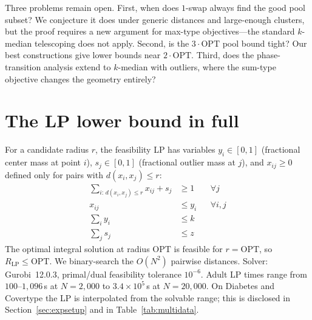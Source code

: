 \documentclass{siam}
\newcommand{\OPT}{\mathrm{OPT}}
\begin{document}
Three problems remain open. First, when does $1$-swap always find the
good pool subset? We conjecture it does under generic distances and
large-enough clusters, but the proof requires a new argument for
max-type objectives---the standard $k$-median telescoping does not
apply. Second, is the $3\cdot\OPT$ pool bound tight? Our best
constructions give lower bounds near $2\cdot\OPT$. Third, does the
phase-transition analysis extend to $k$-median with outliers, where
the sum-type objective changes the geometry entirely?

\appendix
\section{The LP lower bound in full}
\label{app:lp}

For a candidate radius $r$, the feasibility LP has variables
$y_i\in[0,1]$ (fractional center mass at point $i$),
$s_j\in[0,1]$ (fractional outlier mass at $j$), and
$x_{ij}\ge 0$ defined only for pairs with $d(x_i,x_j)\le r$:
\[
\begin{aligned}
  \textstyle\sum_{i:\,d(x_i,x_j)\le r} x_{ij} + s_j &\ge 1
    &&\forall j\\
  x_{ij} &\le y_i &&\forall i,j\\
  \textstyle\sum_i y_i &\le k\\
  \textstyle\sum_j s_j &\le z
\end{aligned}
\]
The optimal integral solution at radius $\OPT$ is feasible for
$r=\OPT$, so $R_{\mathrm{LP}}\le\OPT$. We binary-search the $O(N^2)$
pairwise distances. Solver: Gurobi~12.0.3, primal/dual feasibility
tolerance $10^{-6}$. Adult LP times range from $100$--$1{,}096$\,s at
$N=2{,}000$ to $3.4\times10^{5}$\,s at $N=20{,}000$. On Diabetes and
Covertype the LP is interpolated from the solvable range; this is
disclosed in Section~\ref{sec:expsetup} and in Table~\ref{tab:multidata}.



\end{document}
